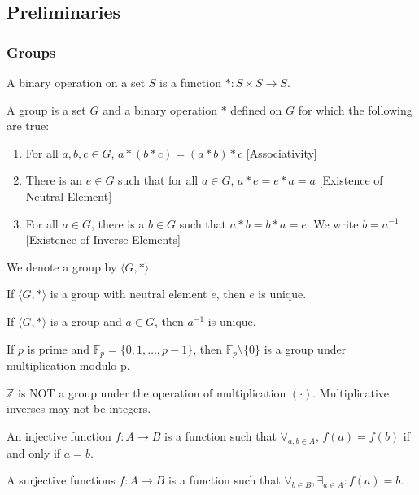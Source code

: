 \documentclass[../main.tex]{subfiles}
\begin{document}
\subsection{Preliminaries}
%
\subsubsection{Groups}
%
\begin{definition}
A binary operation on a set $S$ is a function $*:S\times S \rightarrow S$.
\end{definition}
%
\begin{definition}
A group is a set $G$ and a binary operation $*$ defined on $G$ for which the following are true:
\begin{enumerate}
\item For all $a,b,c\in G$, $a*(b*c) = (a*b)*c$ \hfill [Associativity]
\item There is an $e\in G$ such that for all $a\in G$, $a*e=e*a = a$ \hfill [Existence of Neutral Element]
\item For all $a\in G$, there is a $b\in G$ such that $a*b = b*a = e$. We write $b=a^{-1}$ \hfill [Existence of Inverse Elements]
\end{enumerate}
We denote a group by $\langle G,*\rangle$.
\end{definition}
%
\begin{theorem}
If $\langle G, *\rangle$ is a group with neutral element $e$, then $e$ is unique.
\end{theorem}
%
\begin{theorem}
If $\langle G,*\rangle$ is a group and $a\in G$, then $a^{-1}$ is unique.
\end{theorem}
%
\begin{theorem}
If $p$ is prime and $\mathbb{F}_p = \{0,1,\hdots, p-1\}$, then $\mathbb{F}_p\setminus \{0\}$ is a group under multiplication modulo p.
\end{theorem}
%
\begin{remark}
$\mathbb{Z}$ is NOT a group under the operation of multiplication $(\cdot)$. Multiplicative inverses may not be integers.
\end{remark}
%
\begin{definition}
An injective function $f:A\rightarrow B$ is a function such that $\forall_{a,b\in A}$, $f(a) = f(b)$ if and only if $a=b$.
\end{definition}
%
\begin{definition}
A surjective functions $f:A\rightarrow B$ is a function such that $\forall_{b\in B}, \exists_{a\in A}: f(a) = b$.
\end{definition}
\end{document}
